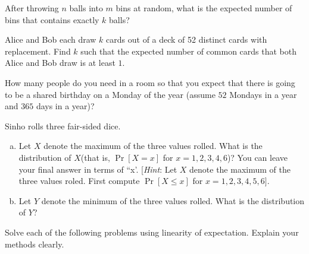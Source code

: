 
\begin{Parts}
    \Part 
    After throwing $n$ balls into $m$ bins at random, what is the expected number of bins that contains exactly $k$ balls?

    \Part
    Alice and Bob each draw $k$ cards out of a deck of 52 distinct cards with replacement.
    Find $k$ such that the expected number of common cards that both Alice and Bob draw is at least $1$.

    \Part
    How many people do you need in a room so that you expect that there is going to be a shared birthday on a Monday of the year (assume $52$ Mondays in a year and $365$ days in a year)?

\end{Parts}



Sinho rolls three fair-sided dice. 

\begin{enumerate}[(a)]

\item Let $X$ denote the maximum of the three values rolled.   What is the distribution of $X $(that is, $\Pr[ X = x ] $ for $x =1, 2, 3,4,6$)?  You can leave your final answer in terms of ``x'. [\textit{Hint}: Let $X$ denote the maximum of the three values roled. First compute $\Pr[X \le x]$ for $x =1, 2,3,4,5,6]$.

\item  Let $Y$ denote the minimum of the three values rolled.  What is the distribution of $Y$? 

\end{enumerate}


Solve each of the following problems using linearity of expectation. Explain your methods clearly.

